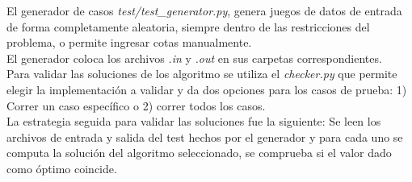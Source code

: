 \documentclass{article}
\begin{document}
El generador de casos \textit{test/test\_generator.py}, genera juegos de datos de entrada de forma completamente aleatoria, siempre dentro de las restricciones del problema, o permite ingresar cotas manualmente.\\

El generador coloca los archivos \textit{.in} y \textit{.out} en sus carpetas correspondientes.\\

Para validar las soluciones de los algoritmo se utiliza el \textit{checker.py} que permite elegir la implementaci\'on a validar y da dos opciones para los casos de prueba: 1) Correr un caso espec\'ifico o 2) correr todos los casos.\\

La estrategia seguida para validar las soluciones fue la siguiente: Se leen los archivos de entrada y salida del test hechos por el generador y para cada uno se computa la soluci\'on del algoritmo seleccionado, se comprueba si el valor dado como \'optimo coincide.\\
\end{document}
